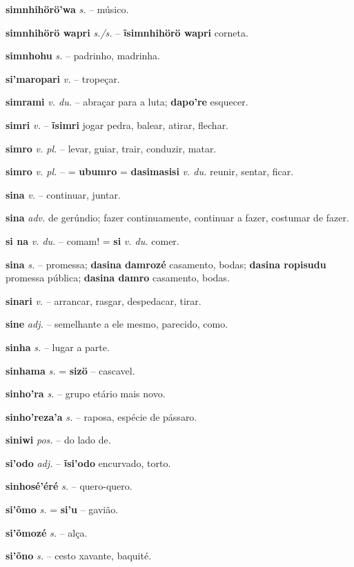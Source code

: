 \textbf{simnhihörö'wa} \textit{s.} -- músico.

\textbf{simnhihörö wapri} \textit{s./s.} -- \textbf{ĩsimnhihörö wapri} corneta.

\textbf{simnhohu} \textit{s.} -- padrinho, madrinha.

\textbf{si'maropari} \textit{v.} -- tropeçar.

\textbf{simrami} \textit{v. du.} -- abraçar para a luta; \textbf{dapo're} esquecer.

\textbf{simri} \textit{v.} -- \textbf{ĩsimri} jogar pedra, balear, atirar, flechar.

\textbf{simro} \textit{v. pl.} -- levar, guiar, trair, conduzir, matar.

\textbf{simro} \textit{v. pl.} -- = \textbf{ubumro} = \textbf{dasimasisi} \textit{v. du.} reunir, sentar, ficar.

\textbf{sina} \textit{v.} -- continuar, juntar.

\textbf{sina} \textit{adv.} de gerúndio; fazer continuamente, continuar a fazer, costumar de fazer.

\textbf{si na} \textit{v. du.} -- comam! = \textbf{si} \textit{v. du.} comer.

\textbf{sina} \textit{s.} -- promessa; \textbf{dasina damrozé} casamento, bodas; \textbf{dasina ropisudu} promessa pública; \textbf{dasina damro} casamento, bodas.

\textbf{sinari} \textit{v.} -- arrancar, rasgar, despedacar, tirar.

\textbf{sine} \textit{adj.} -- semelhante a ele mesmo, parecido, como.

\textbf{sinha} \textit{s.} -- lugar a parte.

\textbf{sinhama} \textit{s.} = \textbf{sizö} -- cascavel.

\textbf{sinho'ra} \textit{s.} -- grupo etário mais novo.

\textbf{sinho'reza'a} \textit{s.} -- raposa, espécie de pássaro.

\textbf{siniwi} \textit{pos.} -- do lado de.

\textbf{si'odo} \textit{adj.} -- \textbf{ĩsi'odo} encurvado, torto.

\textbf{sinhosé'éré} \textit{s.} -- quero-quero.

\textbf{si'õmo} \textit{s.} = \textbf{si'u} -- gavião.

\textbf{si'õmozé} \textit{s.} -- alça.

\textbf{si'õno} \textit{s.} -- cesto xavante, baquité.

